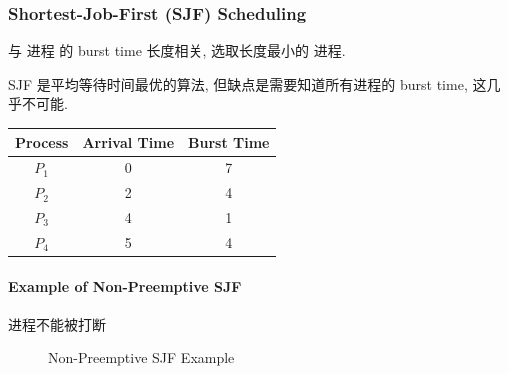 \subsubsection{Shortest-Job-First (SJF) Scheduling}
与 进程 的 burst time 长度相关, 选取长度最小的 进程. 

SJF 是平均等待时间最优的算法, 但缺点是需要知道所有进程的 burst time, 这几乎不可能. 

\begin{table}[!htb]
    \centering
    \begin{tabular}[c]{ccc}\toprule
        Process & Arrival Time & Burst Time \\ \midrule
        $P_1$ & 0 & 7 \\
        $P_2$ & 2 & 4 \\
        $P_3$ & 4 & 1 \\
        $P_4$ & 5 & 4 \\
        \bottomrule
    \end{tabular}
\end{table}

\paragraph{Example of Non-Preemptive SJF}进程不能被打断
\begin{figure}[!htb]
    \centering
    \caption{Non-Preemptive SJF Example}
\end{figure}

